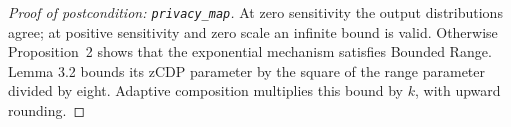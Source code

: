 \documentclass{article}
\begin{document}
\begin{proof}[Proof of postcondition: \texttt{privacy\_map}]

    At zero sensitivity the output distributions agree; at positive sensitivity and zero scale an infinite bound is valid.
    Otherwise \cite{Dong2019OptimalDP} Proposition~2 shows that the exponential mechanism satisfies Bounded Range.
    \cite{cesar2020bounding} Lemma 3.2 bounds its zCDP parameter by the square of the range parameter divided by eight.
    Adaptive composition multiplies this bound by $k$, with upward rounding.
\end{proof}



\end{document}

